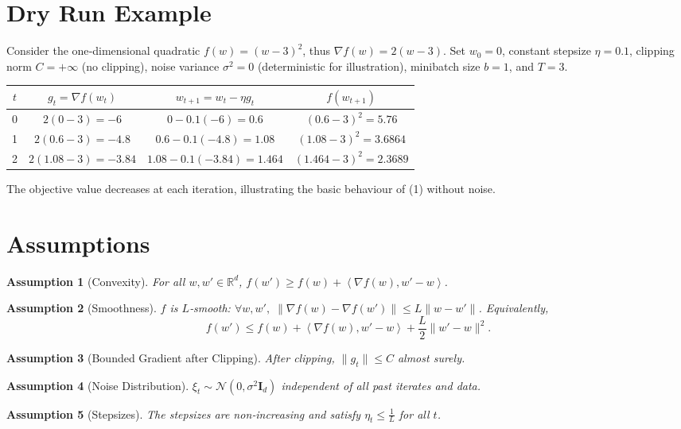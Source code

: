 \documentclass{article}
\newtheorem{assumption}{Assumption}
\newcommand{\RR}{\mathbb{R}}
\newcommand{\inner}[2]{\left\langle #1,#2\right\rangle}
\begin{document}
\section*{Dry Run Example}
Consider the one‑dimensional quadratic $f(w)=(w-3)^2$, thus $\nabla f(w)=2(w-3)$.  
Set $w_0=0$, constant stepsize $\eta=0.1$, clipping norm $C=+\infty$ (no clipping), noise variance $\sigma^2=0$ (deterministic for illustration), minibatch size $b=1$, and $T=3$.

\begin{center}
\begin{tabular}{c|c|c|c}
$t$ & $g_t=\nabla f(w_t)$ & $w_{t+1}=w_t-\eta g_t$ & $f(w_{t+1})$\\ \hline
0 & $2(0-3)=-6$ & $0-0.1(-6)=0.6$ & $(0.6-3)^2=5.76$\\
1 & $2(0.6-3)=-4.8$ & $0.6-0.1(-4.8)=1.08$ & $(1.08-3)^2=3.6864$\\
2 & $2(1.08-3)=-3.84$ & $1.08-0.1(-3.84)=1.464$ & $(1.464-3)^2=2.3689$\\
\end{tabular}
\end{center}
The objective value decreases at each iteration, illustrating the basic behaviour of (1) without noise.

\newpage
\section*{Assumptions}
\begin{assumption}[Convexity]
\label{as:convex}
For all $w,w'\in\RR^d$, $f(w')\ge f(w)+\inner{\nabla f(w)}{w'-w}$.
\end{assumption}
\begin{assumption}[Smoothness]
\label{as:smooth}
$f$ is $L$‑smooth: $\forall w,w',\;
\|\nabla f(w)-\nabla f(w')\|\le L\|w-w'\|$.
Equivalently,
\[
f(w')\le f(w)+\inner{\nabla f(w)}{w'-w}+\frac{L}{2}\|w'-w\|^2 .
\]
\end{assumption}
\begin{assumption}[Bounded Gradient after Clipping]
\label{as:clip}
After clipping, $\|g_t\|\le C$ almost surely.
\end{assumption}
\begin{assumption}[Noise Distribution]
\label{as:noise}
$\xi_t\sim\mathcal N(0,\sigma^2\mathbf I_d)$ independent of all past iterates and data.
\end{assumption}
\begin{assumption}[Stepsizes]
\label{as:steps}
The stepsizes are non‑increasing and satisfy $\eta_t\le \frac{1}{L}$ for all $t$.
\end{assumption}
\end{document}

